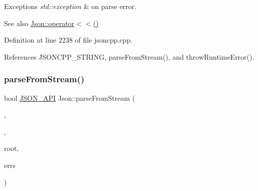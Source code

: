 \begin{DoxyExceptions}{Exceptions}
{\em std\+::exception} & on parse error. \\
\hline
\end{DoxyExceptions}
\begin{DoxySeeAlso}{See also}
\hyperlink{namespace_json_a975d1dbca8aa7a06f38d373edcb9081c}{Json\+::operator$<$$<$()} 
\end{DoxySeeAlso}


Definition at line 2238 of file jsoncpp.\+cpp.



References J\+S\+O\+N\+C\+P\+P\+\_\+\+S\+T\+R\+I\+NG, parse\+From\+Stream(), and throw\+Runtime\+Error().


\mbox{\label{namespace_json_aab0cf1ecf81d1aeca12be2a416a84352}} 
\subsubsection{\texorpdfstring{parse\+From\+Stream()}{parseFromStream()}\hspace{0.1cm}{\footnotesize\ttfamily [1/2]}}
{\footnotesize\ttfamily bool \hyperlink{json_8h_a1d61ffde86ce1a18fd83194ff0d9a206}{J\+S\+O\+N\+\_\+\+A\+PI} Json\+::parse\+From\+Stream (\begin{DoxyParamCaption}\item[{\hyperlink{class_json_1_1_char_reader_1_1_factory}{Char\+Reader\+::\+Factory} const \&}]{,  }\item[{\hyperlink{json_8h_a15f2f70b2ce0a2abd0f8112393dbc4de}{J\+S\+O\+N\+C\+P\+P\+\_\+\+I\+S\+T\+R\+E\+AM} \&}]{,  }\item[{\hyperlink{class_json_1_1_value}{Value} $\ast$}]{root,  }\item[{std\+::string $\ast$}]{errs }\end{DoxyParamCaption})}

